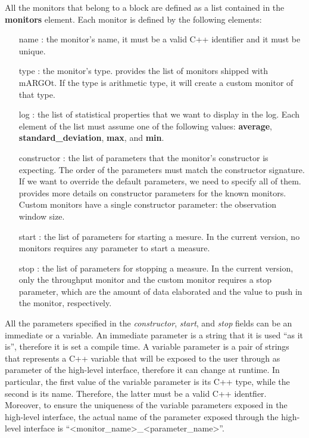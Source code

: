 All the monitors that belong to a block are defined as a list contained in the \textbf{monitors} element.
Each monitor is defined by the following elements:
\begin{itemize}
	\item[name]: the monitor's name, it must be a valid C++ identifier and it must be unique.
	\item[type]: the monitor's type.  provides the list of monitors shipped with mARGOt. If the type is arithmetic type, it will create a custom monitor of that type.
	\item[log]: the list of statistical properties that we want to display in the log. Each element of the list must assume one of the following values: \textbf{average}, \textbf{standard\_deviation}, \textbf{max}, and \textbf{min}.
	\item[constructor]: the list of parameters that the monitor's constructor is expecting. The order of the parameters must match the constructor signature. If we want to override the default parameters, we need to specify all of them.  provides more details on constructor parameters for the known monitors. Custom monitors have a single constructor parameter: the observation window size.
	\item[start]: the list of parameters for starting a mesure. In the current version, no monitors requires any parameter to start a measure.
	\item[stop]: the list of parameters for stopping a measure. In the current version, only the throughput monitor and the custom monitor requires a stop parameter, which are the amount of data elaborated and the value to push in the monitor, respectively.
\end{itemize}

All the parameters specified in the \textit{constructor}, \textit{start}, and \textit{stop} fields can be an immediate or a variable.
An immediate parameter is a string that it is used ``as it is'', therefore it is set a compile time.
A variable parameter is a pair of strings that represents a C++ variable that will be exposed to the user through as parameter of the high-level interface, therefore it can change at runtime.
In particular, the first value of the variable parameter is its C++ type, while the second is its name.
Therefore, the latter must be a valid C++ identfier.
Moreover, to ensure the uniqueness of the variable parameters exposed in the high-level interface, the actual name of the parameter exposed through the high-level interface is ``<monitor\_name>\_<parameter\_name>''.

